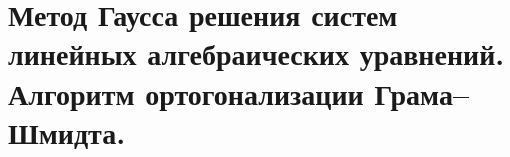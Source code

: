 \section{Метод Гаусса решения систем линейных алгебраических уравнений. Алгоритм ортогонализации Грама–Шмидта.}
